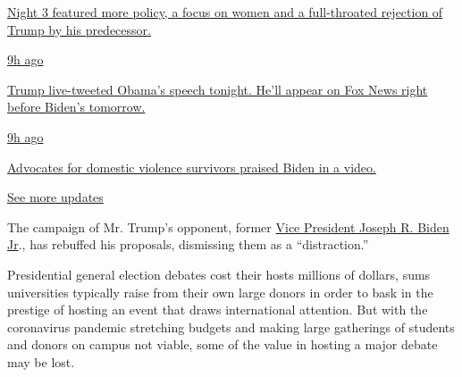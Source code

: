 \href{https://www.nytimes3xbfgragh.onion/live/2020/08/19/us/dnc-convention-election?action=click\&pgtype=Article\&state=default\&region=MAIN_CONTENT_1\&context=storylines_live_updates\#night-3-featured-more-policy-a-focus-on-women-and-a-full-throated-rejection-of-trump-by-his-predecessor}{Night
3 featured more policy, a focus on women and a full-throated rejection
of Trump by his predecessor.}

\href{https://www.nytimes3xbfgragh.onion/live/2020/08/19/us/dnc-convention-election?action=click\&pgtype=Article\&state=default\&region=MAIN_CONTENT_1\&context=storylines_live_updates\#trump-live-tweeted-obamas-speech-tonight-hell-appear-on-fox-news-right-before-bidens-tomorrow}{9h
ago}

\href{https://www.nytimes3xbfgragh.onion/live/2020/08/19/us/dnc-convention-election?action=click\&pgtype=Article\&state=default\&region=MAIN_CONTENT_1\&context=storylines_live_updates\#trump-live-tweeted-obamas-speech-tonight-hell-appear-on-fox-news-right-before-bidens-tomorrow}{Trump
live-tweeted Obama's speech tonight. He'll appear on Fox News right
before Biden's tomorrow.}

\href{https://www.nytimes3xbfgragh.onion/live/2020/08/19/us/dnc-convention-election?action=click\&pgtype=Article\&state=default\&region=MAIN_CONTENT_1\&context=storylines_live_updates\#advocates-for-domestic-violence-survivors-praised-biden-in-a-video}{9h
ago}

\href{https://www.nytimes3xbfgragh.onion/live/2020/08/19/us/dnc-convention-election?action=click\&pgtype=Article\&state=default\&region=MAIN_CONTENT_1\&context=storylines_live_updates\#advocates-for-domestic-violence-survivors-praised-biden-in-a-video}{Advocates
for domestic violence survivors praised Biden in a video.}

\href{https://www.nytimes3xbfgragh.onion/live/2020/08/19/us/dnc-convention-election?action=click\&pgtype=Article\&state=default\&region=MAIN_CONTENT_1\&context=storylines_live_updates}{See
more updates}

The campaign of Mr. Trump's opponent, former
\href{https://www.nytimes3xbfgragh.onion/2020/06/30/us/politics/biden-transition-team.html}{Vice
President Joseph R. Biden Jr}., has rebuffed his proposals, dismissing
them as a ``distraction.''

Presidential general election debates cost their hosts millions of
dollars, sums universities typically raise from their own large donors
in order to bask in the prestige of hosting an event that draws
international attention. But with the coronavirus pandemic stretching
budgets and making large gatherings of students and donors on campus not
viable, some of the value in hosting a major debate may be lost.

